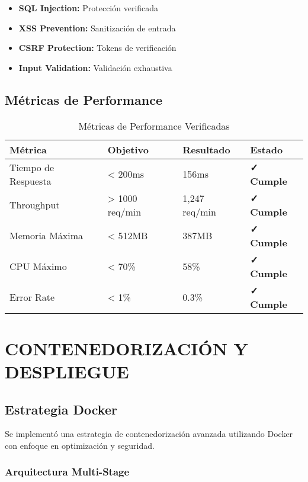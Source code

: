 \documentclass[12pt,a4paper]{article}
\begin{document}
\begin{itemize}
    \item \textbf{SQL Injection:} Protección verificada
    \item \textbf{XSS Prevention:} Sanitización de entrada
    \item \textbf{CSRF Protection:} Tokens de verificación
    \item \textbf{Input Validation:} Validación exhaustiva
\end{itemize}

\subsection{Métricas de Performance}

\begin{table}[h]
\centering
\begin{tabularx}{\textwidth}{|X|X|X|X|}
\hline
\textbf{Métrica} & \textbf{Objetivo} & \textbf{Resultado} & \textbf{Estado} \\
\hline
Tiempo de Respuesta & < 200ms & 156ms & \textcolor{epngreen}{\textbf{✓ Cumple}} \\
\hline
Throughput & > 1000 req/min & 1,247 req/min & \textcolor{epngreen}{\textbf{✓ Cumple}} \\
\hline
Memoria Máxima & < 512MB & 387MB & \textcolor{epngreen}{\textbf{✓ Cumple}} \\
\hline
CPU Máximo & < 70\% & 58\% & \textcolor{epngreen}{\textbf{✓ Cumple}} \\
\hline
Error Rate & < 1\% & 0.3\% & \textcolor{epngreen}{\textbf{✓ Cumple}} \\
\hline
\end{tabularx}
\caption{Métricas de Performance Verificadas}
\end{table}

\section{CONTENEDORIZACIÓN Y DESPLIEGUE}

\subsection{Estrategia Docker}

Se implementó una estrategia de contenedorización avanzada utilizando Docker con enfoque en optimización y seguridad.

\subsubsection{Arquitectura Multi-Stage}
\end{document}
